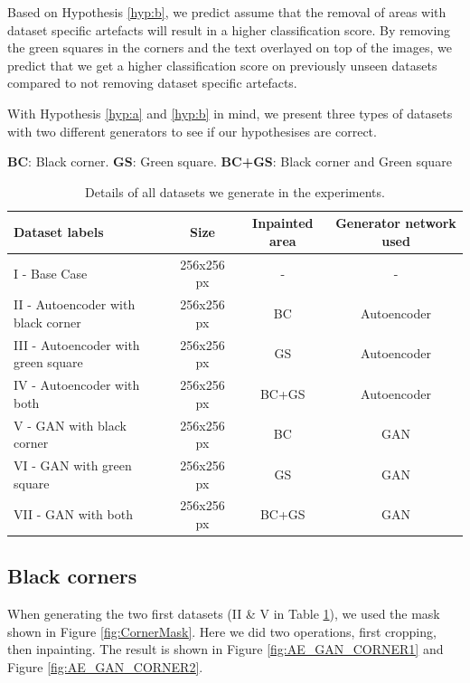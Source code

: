 Based on Hypothesis \ref{hyp:b}, we predict assume that the removal of areas with dataset specific artefacts will result in a higher classification score.  By removing the green squares in the corners and the text overlayed on top of the images, we predict that we get a higher classification score on previously unseen datasets compared to not removing dataset specific artefacts.


With Hypothesis \ref{hyp:a} and \ref{hyp:b} in mind, we present three types of datasets with two different generators to see if our hypothesises are correct.




\begin{table}[h]
\centering
\footnotesize
\caption*{\small \textbf{BC}: Black corner. \textbf{GS}: Green square. \textbf{BC+GS}: Black corner and Green square}
\begin{tabular}{lccc}
\toprule
{Dataset labels} & {Size} & {Inpainted area} & {Generator network used} \\ 
\midrule
I    - Base Case                       & 256x256 px         & -        & -                   \\
II   - Autoencoder with black corner   & 256x256 px         & BC       & Autoencoder         \\
III  - Autoencoder with green square   & 256x256 px         & GS       & Autoencoder         \\
IV   - Autoencoder with both           & 256x256 px         & BC+GS    & Autoencoder         \\
V    - GAN with black corner           & 256x256 px         & BC       & GAN                 \\
VI   - GAN with green square   		   & 256x256 px         & GS       & GAN                 \\
VII  - GAN with both                   & 256x256 px         & BC+GS    & GAN                 \\
\bottomrule
\end{tabular}%
\caption{Details of all datasets we generate in the experiments.} 
\label{tab:datasets}
\end{table}

\FloatBarrier
\subsection{Black corners}
When generating the two first datasets (II \& V in Table \ref{tab:datasets}), we used the mask shown in Figure \ref{fig:CornerMask}. Here we did two operations, first cropping, then inpainting. The result is shown in Figure \ref{fig:AE_GAN_CORNER1} and Figure \ref{fig:AE_GAN_CORNER2}.

